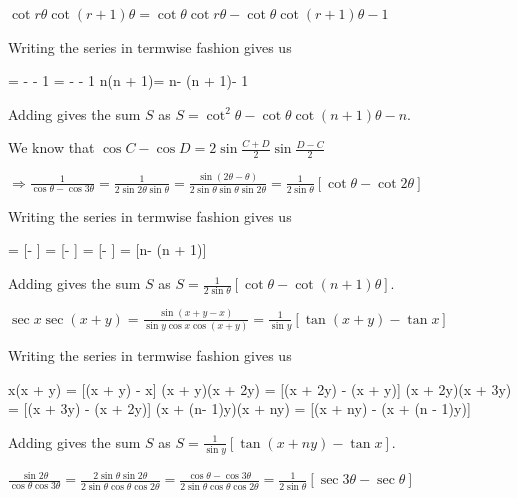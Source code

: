   $\cot r\theta\cot(r + 1)\theta = \cot\theta\cot r\theta - \cot\theta\cot(r + 1)\theta - 1$

  Writing the series in termwise fashion gives us

  \startformula\startalign
    \NC \cot\theta{}\theta \NC = \cot\theta\cot\theta - \cot\theta{}\theta - 1\NR
    \NC {}\theta{}\theta \NC = \cot\theta{}\theta - \cot\theta{}\theta - 1\NR
    \NC\NC\cdots\NR
    \NC \cot n\theta\cot(n + 1)\theta \NC = \cot\theta\cot n\theta - \cot\theta\cot(n + 1)\theta - 1\NR
  \stopalign\stopformula

  Adding gives the sum $S$ as $S = \cot^2\theta - \cot\theta\cot(n + 1)\theta - n$.
\item We know that $\cos C - \cos D = 2\sin\frac{C + D}{2}\sin\frac{D - C}{2}$

  $\Rightarrow \frac{1}{\cos\theta - \cos3\theta} = \frac{1}{2\sin2\theta\sin\theta} = \frac{\sin(2\theta -
  \theta)}{2\sin\theta\sin\theta\sin2\theta} = \frac{1}{2\sin\theta}[\cot\theta - \cot2\theta]$

  Writing the series in termwise fashion gives us

  \startformula\startalign
    \NC {} \NC = [\cot\theta - \theta]\NR
    \NC {} \NC = [\theta - \theta]\NR
    \NC {} \NC = [\theta - \theta]\NR
    \NC\NC \cdots\NR
    \NC {} \NC = [\cot n\theta - \cot(n + 1)\theta]\NR
  \stopalign\stopformula

  Adding gives the sum $S$ as $S = \frac{1}{2\sin\theta}[\cot\theta - \cot(n + 1)\theta]$.
\item $\sec x\sec(x + y) = \frac{\sin(x + y - x)}{\sin y\cos x \cos(x + y)} = \frac{1}{\sin y}[\tan(x + y) -
  \tan x]$

  Writing the series in termwise fashion gives us

  \startformula\startalign
    \NC \sec x\sec(x + y) \NC = [\tan(x + y) - \tan x]\NR
    \NC \sec(x + y)\sec(x + 2y) \NC = [\tan(x + 2y) - \tan(x + y)]\NR
    \NC \sec(x + 2y)\sec(x + 3y) \NC = [\tan(x + 3y) - \tan(x + 2y)]\NR
    \NC\NC \cdots \NR
    \NC \sec(x + (n- 1)y)\sec(x + ny) \NC = [\tan(x + ny) - \tan(x + (n - 1)y)]\NR
  \stopalign\stopformula

  Adding gives the sum $S$ as $S = \frac{1}{\sin y}[\tan(x + ny) - \tan x]$.
\item $\frac{\sin2\theta}{\cos\theta\cos3\theta} =
  \frac{2\sin\theta\sin2\theta}{2\sin\theta\cos\theta\cos2\theta} = \frac{\cos\theta -
    \cos3\theta}{2\sin\theta\cos\theta\cos2\theta} = \frac{1}{2\sin\theta}[\sec3\theta - \sec\theta]$

